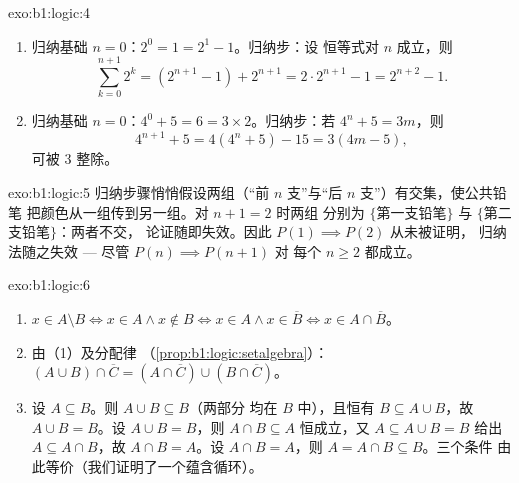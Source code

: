 \begin{solution}{exo:b1:logic:4}
\begin{enumerate}
  \item 归纳基础 $n = 0$：$2^0 = 1 = 2^1 - 1$。归纳步：设
        恒等式对 $n$ 成立，则
        \[
        \sum_{k=0}^{n+1} 2^k = (2^{n+1} - 1) + 2^{n+1}
        = 2 \cdot 2^{n+1} - 1 = 2^{n+2} - 1 .
        \]
  \item 归纳基础 $n = 0$：$4^0 + 5 = 6 = 3 \times 2$。归纳步：若
        $4^n + 5 = 3m$，则
        \[
        4^{n+1} + 5 = 4(4^n + 5) - 15 = 3(4m - 5),
        \]
        可被 $3$ 整除。
\end{enumerate}
\end{solution}

\begin{solution}{exo:b1:logic:5}
归纳步骤悄悄假设两组（“前
$n$ 支”与“后 $n$ 支”）有交集，使公共铅笔
把颜色从一组传到另一组。对 $n + 1 = 2$ 时两组
分别为 $\{$第一支铅笔$\}$ 与 $\{$第二支铅笔$\}$：两者不交，
论证随即失效。因此 $P(1) \implies P(2)$ 从未被证明，
归纳法随之失效 --- 尽管 $P(n) \implies P(n+1)$ 对
每个 $n \geq 2$ 都成立。
\end{solution}

\begin{solution}{exo:b1:logic:6}
\begin{enumerate}
  \item $x \in A \setminus B \iff x \in A \land x \notin B \iff x \in
        A \land x \in \overline{B} \iff x \in A \cap \overline{B}$。
  \item 由（1）及分配律
        （\cref{prop:b1:logic:setalgebra}）：
        $(A \cup B) \cap \overline{C} = (A \cap \overline{C}) \cup
        (B \cap \overline{C})$。
  \item 设 $A \subseteq B$。则 $A \cup B \subseteq B$（两部分
        均在 $B$ 中），且恒有 $B \subseteq A \cup B$，故
        $A \cup B = B$。设 $A \cup B = B$，则 $A \cap B
        \subseteq A$ 恒成立，又 $A \subseteq A \cup B = B$ 给出
        $A \subseteq A \cap B$，故 $A \cap B = A$。设 $A \cap B =
        A$，则 $A = A \cap B \subseteq B$。三个条件
        由此等价（我们证明了一个蕴含循环）。
\end{enumerate}
\end{solution}

